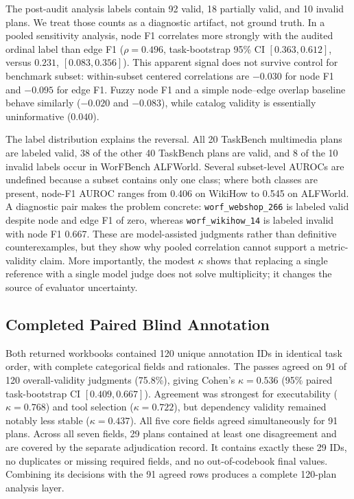 \documentclass[10pt]{article}
\begin{document}
The post-audit analysis labels contain 92 valid, 18 partially valid, and 10
invalid plans. We treat those counts as a diagnostic artifact, not ground
truth. In a pooled sensitivity analysis, node F1 correlates more strongly with
the audited ordinal label than edge F1 ($\rho=0.496$, task-bootstrap 95\% CI
$[0.363,0.612]$, versus $0.231$, $[0.083,0.356]$). This apparent signal does
not survive control for benchmark subset: within-subset centered correlations
are $-0.030$ for node F1 and $-0.095$ for edge F1. Fuzzy node F1 and a simple
node--edge overlap baseline behave similarly ($-0.020$ and $-0.083$), while
catalog validity is essentially uninformative ($0.040$).

The label distribution explains the reversal. All 20 TaskBench multimedia
plans are labeled valid, 38 of the other 40 TaskBench plans are valid, and 8 of
the 10 invalid labels occur in WorFBench ALFWorld. Several subset-level AUROCs
are undefined because a subset contains only one class; where both classes are
present, node-F1 AUROC ranges from 0.406 on WikiHow to 0.545 on ALFWorld. A
diagnostic pair makes the problem concrete: \texttt{worf\_webshop\_266} is
labeled valid despite node and edge F1 of zero, whereas
\texttt{worf\_wikihow\_14} is labeled invalid with node F1 0.667. These are
model-assisted judgments rather than definitive counterexamples, but they show
why pooled correlation cannot support a metric-validity claim. More
importantly, the modest $\kappa$ shows that replacing a single reference with a
single model judge does not solve multiplicity; it changes the source of
evaluator uncertainty.

\subsection{Completed Paired Blind Annotation}
Both returned workbooks contained 120 unique annotation IDs in identical task
order, with complete categorical fields and rationales. The passes agreed on
91 of 120 overall-validity judgments (75.8\%), giving Cohen's
$\kappa=0.536$ (95\% paired task-bootstrap CI $[0.409,0.667]$). Agreement was
strongest for executability ($\kappa=0.768$) and tool selection
($\kappa=0.722$), but dependency validity remained notably less stable
($\kappa=0.437$). All five core fields agreed simultaneously for 91 plans.
Across all seven fields, 29 plans contained at least one disagreement and are
covered by the separate adjudication record. It contains exactly these 29 IDs,
no duplicates or missing required fields, and no out-of-codebook final values.
Combining its decisions with the 91 agreed rows produces a complete 120-plan
analysis layer.
\end{document}
